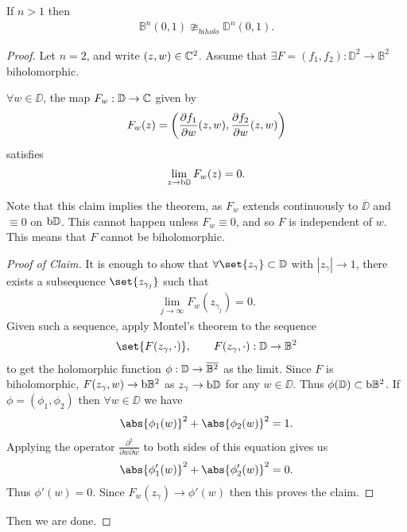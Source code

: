 \begin{theorem}[Poincare, 1907]
    If $n > 1$ then
    \begin{align*}
        \mathbb{B}^n (0,1) \ncong_{biholo} \mathbb{D}^n (0,1).
    \end{align*}
\end{theorem}

\begin{proof}
    Let $n=2$, and write $(z,w) \in \mathbb{C}^2$. Assume that $\exists F = (f_1,f_2) : \mathbb{D}^2 \to \mathbb{B}^2$ biholomorphic.
    \begin{claim}
        $\forall w \in \DD$, the map $F_w : \mathbb{D} \to \mathbb{C}$ given by
        \begin{align*}
            F_w(z) = \left(  \frac{\partial f_1}{\partial w} (z,w) , \frac{\partial f_2}{\partial w} (z,w)   \right)
        \end{align*}
        satisfies
        \begin{align*}
            \lim_{z \to \operatorname{b}\! \mathbb{D}} F_w (z) = 0.
        \end{align*}
    \end{claim}
    Note that this claim implies the theorem, as $F_w$ extends continuously to $\overline{\DD}$ and $\equiv 0$ on $\operatorname{b}\! \mathbb{D}$. This cannot happen unless $F_w \equiv 0$, and so $F$ is independent of $w$. This means that $F$ cannot be biholomorphic.

    \begin{proof}[Proof of Claim]
        It is enough to show that $\forall \set{z_\gamma} \subset \DD$ with $|z_\gamma| \to 1$, there exists a subsequence $\set{z_{\gamma_j}}$ such that
        \begin{align*}
            \lim_{j \to \infty} F_w(z_{\gamma_j}) = 0.
        \end{align*}
        Given such a sequence, apply Montel's theorem to the sequence
        \begin{align*}
            \set{F(z_\gamma , \cdot) }, \qquad F(z_\gamma , \cdot) : \DD \to \ball^2
        \end{align*}
        to get the holomorphic function $\phi : \DD \to \overline{\ball^2}$ as the limit. Since $F$ is biholomorphic, $F(z_\gamma, w) \to \bdy \ball^2$ as $z_\gamma \to \operatorname{b}\! \mathbb{D}$ for any $w \in \DD$. Thus $\phi(\DD) \subset \bdy \ball^2$. If $\phi = (\phi_1 , \phi_2)$ then $\forall w \in \DD$ we have
        \begin{align*}
            \abs{\phi_1(w)}^2 + \abs{\phi_2(w)}^2 = 1.
        \end{align*}
        Applying the operator $\frac{\partial^2}{\partial w \partial \overline{w}}$ to both sides of this equation gives us
        \begin{align*}
            \abs{ \phi'_1(w) }^2 + \abs{ \phi'_2(w) }^2 = 0.
        \end{align*}
        Thus $\phi'(w) = 0$. Since $F_w(z_\gamma) \to \phi'(w)$ then this proves the claim.
    \end{proof}
    Then we are done.
\end{proof}

